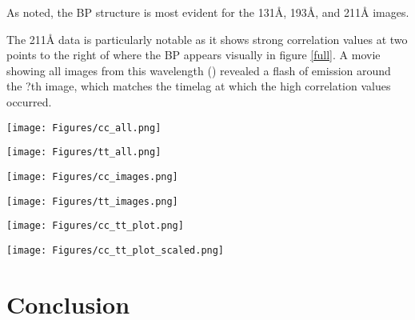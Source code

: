 \documentclass[preprint2]{aastex}
\begin{document}
As \cite{Alipour} noted, the BP structure is most evident for the
131\AA{}, 193\AA{}, and 211\AA{} images.

The 211\AA{} data is particularly notable as it shows strong correlation values
at two points to the right of where the BP appears visually in figure \ref{full}.
A movie showing all images from this wavelength (\cite{ssw}) revealed a flash
of emission around the ?th image, which matches the timelag at which the high
correlation values occurred.

\begin{figure*}[htb!]
    \texttt{[image: Figures/cc\_all.png]}
    \caption{Images showing the highest cross-correlation value for each pixel. }
    \label{cc_all}
\end{figure*}

\begin{figure*}[htb!]
    \texttt{[image: Figures/tt\_all.png]}
    \caption{Images showing the timelag corresponding to the correlation values
        illustrated in figure \ref{cc_all}.}
    \label{tt_all}
\end{figure*}

\begin{figure*}[htb!]
    \texttt{[image: Figures/cc\_images.png]}
    \caption{Cross-correlation images scaled to show only values higher than 0.5.}
    \label{cc}
\end{figure*}

\begin{figure*}[htb!]
    \texttt{[image: Figures/tt\_images.png]}
    \caption{Timelag corresponding to the cross-correlation values higher than 0.5.}
    \label{tt}
\end{figure*}

\begin{figure*}[htb!]
    \texttt{[image: Figures/cc\_tt\_plot.png]}
    \caption{The highest cross-correlation value of each pixel is plotted as a function
        of its distance from the center pixel. The color indicates the timelag
        corresponding to the maximum cross-correlation for that pixel.}
    \label{tt_all_plot}
\end{figure*}

\begin{figure*}[htb!]
    \texttt{[image: Figures/cc\_tt\_plot\_scaled.png]}
    \caption{Same as figure \ref{tau_all}, but with two thirds of the timelag cut out
        at both ends.}
    \label{tt_plot}
\end{figure*}


\section{Conclusion}\label{conclusion}


\end{document}
